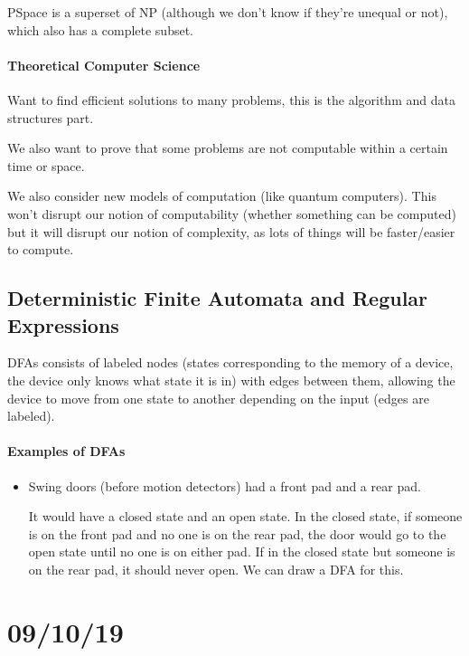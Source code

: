 \documentclass[12 pt]{article}
\begin{document}
PSpace is a superset of NP (although we don't know if they're unequal
or not), which also has a complete subset.

\paragraph{Theoretical Computer Science}
Want to find efficient solutions to many problems, this is the
algorithm and data structures part.

We also want to prove that some problems are not computable within a
certain time or space.

We also consider new models of computation (like quantum
computers). This won't disrupt our notion of computability (whether
something can be computed) but it will disrupt our notion of
complexity, as lots of things will be faster/easier to compute.

\subsection{Deterministic Finite Automata and Regular Expressions}
DFAs consists of labeled nodes (states corresponding to the memory of
a device, the device only knows what state it is in) with edges
between them, allowing the device to move from one state to another
depending on the input (edges are labeled).

\paragraph{Examples of DFAs}
\begin{itemize}
\item Swing doors (before motion detectors) had a front pad and a rear
  pad.

  It would have a closed state and an open state. In the closed state,
  if someone is on the front pad and no one is on the rear pad, the
  door would go to the open state until no one is on either pad. If in
  the closed state but someone is on the rear pad, it should never
  open. We can draw a DFA for this.
\end{itemize}
\section{09/10/19}
\end{document}
